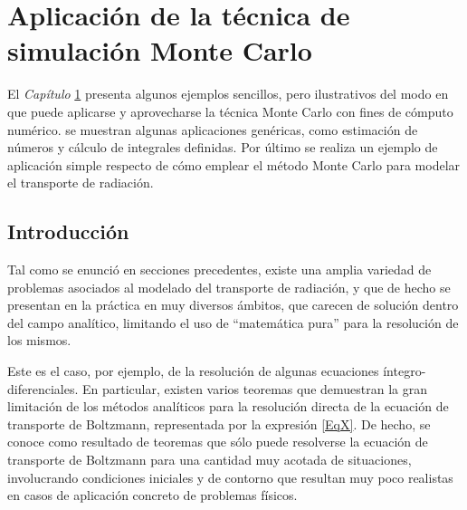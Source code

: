 \chapter{Aplicaci\'on de la t\'ecnica de simulaci\'on Monte Carlo}
\label{CapVII}

El \textit{Cap\'itulo} \ref{CapVII} presenta algunos ejemplos sencillos, pero ilustrativos del modo en que puede aplicarse y aprovecharse la
t\'ecnica Monte Carlo con fines de c\'omputo num\'erico. se muestran algunas aplicaciones gen\'ericas, como estimaci\'on de n\'umeros y
c\'alculo de integrales definidas. Por \'ultimo se realiza un ejemplo de aplicaci\'on simple respecto de c\'omo emplear el m\'etodo Monte
Carlo para modelar el transporte de radiaci\'on.

\section{Introducci\'on}
\label{CapVII_1}

Tal como se enunci\'o en secciones precedentes, existe una amplia variedad de problemas asociados al modelado del transporte de radiaci\'on,
y que de hecho se presentan en la pr\'actica en muy diversos \'ambitos, que carecen de soluci\'on dentro del campo anal\'itico, limitando
el uso de ``matem\'atica pura'' para la resoluci\'on de los mismos.
%

Este es el caso, por ejemplo, de la resoluci\'on de algunas ecuaciones \'integro-diferenciales. En particular, existen varios teoremas que
demuestran la gran limitaci\'on de los m\'etodos anal\'iticos para la resoluci\'on directa de la ecuaci\'on de transporte de Boltzmann,
representada por la expresi\'on \ref{EqX}. De hecho, se conoce como resultado de teoremas que s\'olo puede resolverse la ecuaci\'on de
transporte de Boltzmann para una cantidad muy acotada de situaciones, involucrando condiciones iniciales y de contorno que resultan muy poco
realistas en casos de aplicaci\'on concreto de problemas f\'isicos.
%

